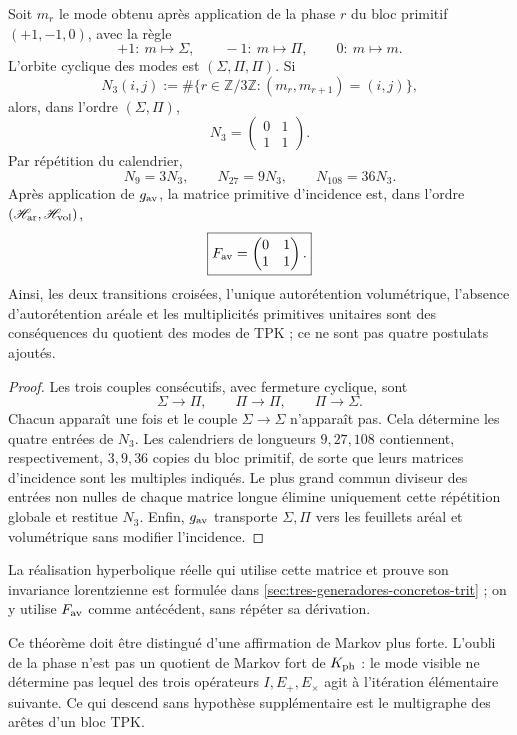 \begin{theorem}
\label{thm:descenso-necesario-fav}
Soit \(m_r\) le mode obtenu après application de la phase \(r\) du bloc
primitif \((+1,-1,0)\), avec la règle
\[
 +1:\ m\mapsto\Sigma,\qquad
 -1:\ m\mapsto\Pi,\qquad
 0:\ m\mapsto m.
\]
L'orbite cyclique des modes est \((\Sigma,\Pi,\Pi)\). Si
\[
 N_3(i,j)
 :=
 \#\{r\in\mathbb Z/3\mathbb Z:(m_r,m_{r+1})=(i,j)\},
\]
alors, dans l'ordre \((\Sigma,\Pi)\),
\[
 \boxed{
 N_3=
 \begin{pmatrix}0&1\\1&1\end{pmatrix}.}
\]
Par répétition du calendrier,
\[
 N_9=3N_3,\qquad N_{27}=9N_3,\qquad N_{108}=36N_3.
\]
Après application de \(\mathfrak g_{\rm av}\), la matrice primitive
d'incidence est, dans l'ordre
\((\mathscr H_{\rm ar},\mathscr H_{\rm vol})\),
\[
 \boxed{
 F_{\rm av}=
 \begin{pmatrix}0&1\\1&1\end{pmatrix}.}
\]
Ainsi, les deux transitions croisées, l'unique autorétention volumétrique,
l'absence d'autorétention aréale et les multiplicités primitives unitaires
sont des conséquences du quotient des modes de TPK ; ce ne sont pas quatre postulats
ajoutés.
\end{theorem}

\begin{proof}
Les trois couples consécutifs, avec fermeture cyclique, sont
\[
 \Sigma\longrightarrow\Pi,\qquad
 \Pi\longrightarrow\Pi,\qquad
 \Pi\longrightarrow\Sigma.
\]
Chacun apparaît une fois et le couple
\(\Sigma\to\Sigma\) n'apparaît pas. Cela détermine les quatre entrées de
\(N_3\). Les calendriers de longueurs \(9,27,108\) contiennent,
respectivement, \(3,9,36\) copies du bloc primitif, de sorte que leurs
matrices d'incidence sont les multiples indiqués. Le plus grand commun diviseur
des entrées non nulles de chaque matrice longue élimine uniquement cette
répétition globale et restitue \(N_3\). Enfin,
\(\mathfrak g_{\rm av}\) transporte \(\Sigma,\Pi\) vers les feuillets aréal et
volumétrique sans modifier l'incidence.
\end{proof}

La réalisation hyperbolique réelle qui utilise cette matrice et prouve son
invariance lorentzienne est formulée dans
\cref{sec:tres-generadores-concretos-trit} ; on y utilise \(F_{\rm av}\)
comme antécédent, sans répéter sa dérivation.

Ce théorème doit être distingué d'une affirmation de Markov plus forte.
L'oubli de la phase n'est pas un quotient de Markov fort de
\(\mathcal K_{\rm ph}\) : le mode visible ne détermine pas lequel des trois
opérateurs \(I,E_+,E_\times\) agit à l'itération élémentaire suivante. Ce qui descend
sans hypothèse supplémentaire est le multigraphe des arêtes d'un bloc TPK\@.

